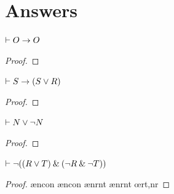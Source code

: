 
\newpage

\section{Answers}
\setcounter{ProbPart}{0}

\problempart


\begin{earg}

\begin{minipage}{10cm}
\item $\vdash O \rightarrow O$
\begin{proof}
\open
	 \as{}
\close
{}
\end{proof}
\bigskip
\end{minipage}


\item $\vdash S \rightarrow (S \vee R)$
\begin{proof}
\open
	 \as{}
	 
	 
\close
{}
\end{proof}
\bigskip


\item $\vdash N \vee {\neg} N$
\begin{proof}
\open
         \as{}
        \open
                 \as{}
                 
        \close
         
         
         
\close
{} 
\end{proof}
\bigskip


\begin{minipage}{10cm}
\item $\vdash {\neg}((R \vee T) \mathbin{\&} ({\neg} R  \mathbin{\&} {\neg} T))$
\begin{proof}
\open
         \as{}
         \ae{ncon}
         \ae{ncon}
         \ae{nrnt}
         \ae{nrnt}
         \oe{rt,nr}
\close
{} 
\end{proof}
\bigskip
\end{minipage}


\end{earg}
